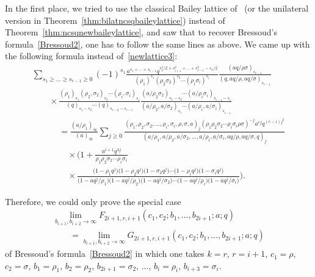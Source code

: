 \documentclass[pdftex]{sigma}
\numberwithin{equation}{section}
\begin{document}
In the first place, we tried to use the classical Bailey lattice of~\cite[Theorem 3.1]{AAB} (or the unilateral version in Theorem~\ref{thm:bilatncsqbaileylattice}) instead of Theorem~\ref{thm:ncsqnewbaileylattice}, and saw that to recover Bressoud's formula~\eqref{Bressoud2}, one has to follow the same lines as above. We came up with the following formula instead of~\eqref{newlattice3}:
\begin{gather}
\sum_{s_1\geq\dots\geq s_{r-1}\geq0}(-1)^{s_1}\frac{a^{s_1+\dots+s_{r-1}}q^{s_1^2/2+s_{i+1}^2+\dots+s_{r-1}^2-s_1/2}}{(\rho_1)^{s_1}(\rho_{2}\sigma_{2})^{s_{2}} \cdots(\rho_{i}\sigma_{i})^{s_{i}}}
\frac{(aq/\rho\sigma)_{s_{r-1}}}{(q,aq/\rho,aq/\sigma)_{s_{r-1}}}\nonumber\\
\qquad{}\times\frac{(\rho_1)_{s_1}(\rho_{2},\sigma_{2})_{s_{2}}\cdots(\rho_{i},\sigma_{i})_{s_{i}}}{(q)_{s_1-s_2} \cdots(q)_{s_{r-2}-s_{r-1}}}\frac{(a/\rho_2\sigma_2)_{s_1-s_2}
\cdots(a/\rho_i\sigma_i)_{s_{i-1}-s_i}}{(a/\rho_2,a/\sigma_2)_{s_1}\cdots(a/\rho_i,a/\sigma_i)_{s_{i-1}}}\nonumber\\
\phantom{\qquad{}\times}=\frac{(a/\rho_1)_\infty}{(a)_\infty}
\sum_{j\geq0}\frac{(\rho_1,\rho_2,\sigma_2,\dots,\rho_{i},\sigma_{i},\rho,\sigma,a)_j
(\rho_1\rho_2\sigma_2\cdots\rho_{i}\sigma_{i}\rho\sigma)^{-j}a^{rj}q^{(r-i)j^2}}{(a/\rho_1,a/\rho_2,a/\sigma_2,\dots,a/\rho_i,a/\sigma_i,aq/\rho,aq/\sigma,q)_j}
\nonumber\\
\phantom{\qquad\times=}\times\bigg(1+\frac{a^{i+1}q^{3j}}{\rho_1\rho_2\sigma_2\cdots\rho_i\sigma_i}\nonumber\\
\phantom{\qquad\times=}\times\frac{\bigl(1-\rho_1q^j\bigr)\bigl(1-\rho_2q^j\bigr)\bigl(1-\sigma_2q^j\bigr) \cdots\bigl(1-\rho_iq^j\bigr)\bigl(1-\sigma_iq^j\bigr)}{\bigl(1-aq^j/\rho_1\bigr)
\bigl(1-aq^j/\rho_2\bigr)\bigl(1-aq^j/\sigma_2\bigr)\cdots\bigl(1-aq^j/\rho_i\bigr)\bigl(1-aq^j/\sigma_i\bigr)}\bigg).\label{lattice3}
\end{gather}

Therefore, we could only prove the special case
\begin{gather*}
\lim_{b_{i+1},b_{i+2}\to\infty}F_{2i+1,r,i+1}(c_1,c_2;b_1,\dots,b_{2i+1};a;q)\\
\qquad=\lim_{b_{i+1},b_{i+2}\to\infty}G_{2i+1,r,i+1}(c_1,c_2;b_1,\dots,b_{2i+1};a;q)
\end{gather*}
of Bressoud's formula~\eqref{Bressoud2} in which one takes $k=r$, $r=i+1$, $c_1=\rho$, $c_2=\sigma$, $b_1=\rho_1$, $b_2=\rho_2$, $b_{2i+1}=\sigma_2$, $\dots$, $b_{i}=\rho_i$, $b_{i+3}=\sigma_i$.
\end{document}
